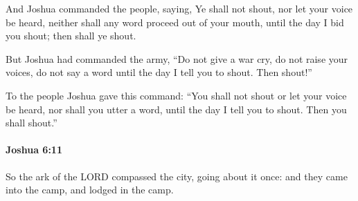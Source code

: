 			\begin{versebox}
					\item[BHS] 
					\item[ASV] And Joshua commanded the people, saying, Ye shall not shout, nor let your voice be heard, neither shall any word proceed out of your mouth, until the day I bid you shout; then shall ye shout.
					\item[NIV] But Joshua had commanded the army, “Do not give a war cry, do not raise your voices, do not say a word until the day I tell you to shout. Then shout!”
					\item[NRSV] To the people Joshua gave this command: “You shall not shout or let your voice be heard, nor shall you utter a word, until the day I tell you to shout. Then you shall shout.”
			\end{versebox}

		\paragraph{Joshua 6:11} %
			\label{JOSHUA-6-11}

			So the ark of the LORD compassed the city, going about it once: and they came into the camp, and lodged in the camp.


